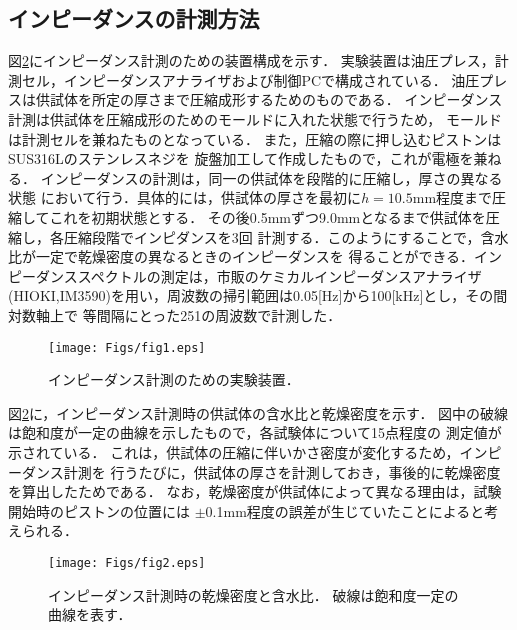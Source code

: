 \documentclass{jsce}
\begin{document}
\subsection{インピーダンスの計測方法}
図\ref{fig:fig2}にインピーダンス計測のための装置構成を示す．
実験装置は油圧プレス，計測セル，インピーダンスアナライザおよび制御PCで構成されている．
油圧プレスは供試体を所定の厚さまで圧縮成形するためのものである．
インピーダンス計測は供試体を圧縮成形のためのモールドに入れた状態で行うため，
モールドは計測セルを兼ねたものとなっている．
また，圧縮の際に押し込むピストンはSUS316Lのステンレスネジを
旋盤加工して作成したもので，これが電極を兼ねる．
インピーダンスの計測は，同一の供試体を段階的に圧縮し，厚さの異なる状態
において行う．具体的には，供試体の厚さを最初に$h=10.5$mm程度まで圧縮してこれを初期状態とする．
その後0.5mmずつ9.0mmとなるまで供試体を圧縮し，各圧縮段階でインピダンスを3回
計測する．このようにすることで，含水比が一定で乾燥密度の異なるときのインピーダンスを
得ることができる．インピーダンススペクトルの測定は，市販のケミカルインピーダンスアナライザ
(HIOKI,IM3590)を用い，周波数の掃引範囲は0.05[Hz]から100[kHz]とし，その間対数軸上で
等間隔にとった251の周波数で計測した．
\begin{figure}[h]
	\begin{center}
	\texttt{[image: Figs/fig1.eps]} 
	\end{center}
	\caption{
		インピーダンス計測のための実験装置．
	} 
	\label{fig:fig1}
\end{figure}
図\ref{fig:fig2}に，インピーダンス計測時の供試体の含水比と乾燥密度を示す．
図中の破線は飽和度が一定の曲線を示したもので，各試験体について15点程度の
測定値が示されている．
これは，供試体の圧縮に伴いかさ密度が変化するため，インピーダンス計測を
行うたびに，供試体の厚さを計測しておき，事後的に乾燥密度を算出したためである．
なお，乾燥密度が供試体によって異なる理由は，試験開始時のピストンの位置には
$\pm$0.1mm程度の誤差が生じていたことによると考えられる．
\begin{figure}[h]
	\begin{center}
	\texttt{[image: Figs/fig2.eps]} 
	\end{center}
	\caption{
		インピーダンス計測時の乾燥密度と含水比．
		破線は飽和度一定の曲線を表す．
	} 
	\label{fig:fig2}
\end{figure}
\end{document}
